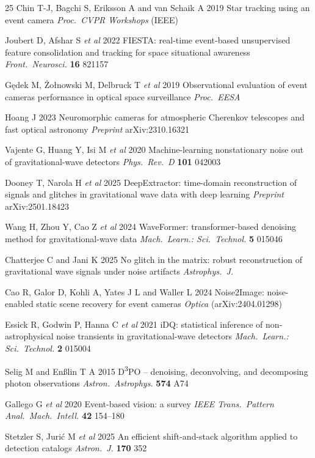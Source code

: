 \documentclass[12pt]{article}
\begin{document}
\begin{thebibliography}{25}
Chin T-J, Bagchi S, Eriksson A and van Schaik A 2019
Star tracking using an event camera
\emph{Proc.\ CVPR Workshops} (IEEE)

Joubert D, Afshar S \emph{et al} 2022
FIESTA: real-time event-based unsupervised feature consolidation and tracking for space situational awareness
\emph{Front.\ Neurosci.} \textbf{16} 821157

G\k{e}dek M, {\.Z}o{\l}nowski M, Delbruck T \emph{et al} 2019
Observational evaluation of event cameras performance in optical space surveillance
\emph{Proc.\ EESA}

Hoang J 2023
Neuromorphic cameras for atmospheric Cherenkov telescopes and fast optical astronomy
\emph{Preprint} arXiv:2310.16321

Vajente G, Huang Y, Isi M \emph{et al} 2020
Machine-learning nonstationary noise out of gravitational-wave detectors
\emph{Phys.\ Rev.\ D} \textbf{101} 042003

Dooney T, Narola H \emph{et al} 2025
DeepExtractor: time-domain reconstruction of signals and glitches in gravitational wave data with deep learning
\emph{Preprint} arXiv:2501.18423

Wang H, Zhou Y, Cao Z \emph{et al} 2024
WaveFormer: transformer-based denoising method for gravitational-wave data
\emph{Mach.\ Learn.: Sci.\ Technol.} \textbf{5} 015046

Chatterjee C and Jani K 2025
No glitch in the matrix: robust reconstruction of gravitational wave signals under noise artifacts
\emph{Astrophys.\ J.}

Cao R, Galor D, Kohli A, Yates J L and Waller L 2024
Noise2Image: noise-enabled static scene recovery for event cameras
\emph{Optica} (arXiv:2404.01298)

Essick R, Godwin P, Hanna C \emph{et al} 2021
iDQ: statistical inference of non-astrophysical noise transients in gravitational-wave detectors
\emph{Mach.\ Learn.: Sci.\ Technol.} \textbf{2} 015004

Selig M and En{\ss}lin T A 2015
D\textsuperscript{3}PO -- denoising, deconvolving, and decomposing photon observations
\emph{Astron.\ Astrophys.} \textbf{574} A74

Gallego G \emph{et al} 2020
Event-based vision: a survey
\emph{IEEE Trans.\ Pattern Anal.\ Mach.\ Intell.} \textbf{42} 154--180

Stetzler S, Juri{\'c} M \emph{et al} 2025
An efficient shift-and-stack algorithm applied to detection catalogs
\emph{Astron.\ J.} \textbf{170} 352

\end{thebibliography}
\end{document}
